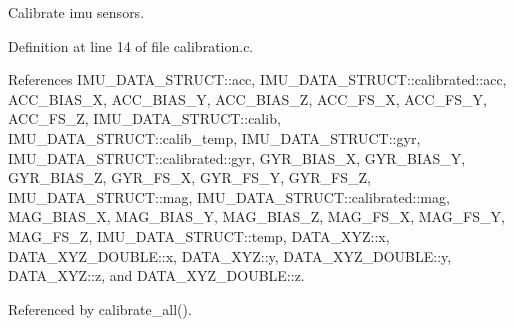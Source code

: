 Calibrate imu sensors. 



Definition at line 14 of file calibration.\-c.



References I\-M\-U\-\_\-\-D\-A\-T\-A\-\_\-\-S\-T\-R\-U\-C\-T\-::acc, I\-M\-U\-\_\-\-D\-A\-T\-A\-\_\-\-S\-T\-R\-U\-C\-T\-::calibrated\-::acc, A\-C\-C\-\_\-\-B\-I\-A\-S\-\_\-\-X, A\-C\-C\-\_\-\-B\-I\-A\-S\-\_\-\-Y, A\-C\-C\-\_\-\-B\-I\-A\-S\-\_\-\-Z, A\-C\-C\-\_\-\-F\-S\-\_\-\-X, A\-C\-C\-\_\-\-F\-S\-\_\-\-Y, A\-C\-C\-\_\-\-F\-S\-\_\-\-Z, I\-M\-U\-\_\-\-D\-A\-T\-A\-\_\-\-S\-T\-R\-U\-C\-T\-::calib, I\-M\-U\-\_\-\-D\-A\-T\-A\-\_\-\-S\-T\-R\-U\-C\-T\-::calib\-\_\-temp, I\-M\-U\-\_\-\-D\-A\-T\-A\-\_\-\-S\-T\-R\-U\-C\-T\-::gyr, I\-M\-U\-\_\-\-D\-A\-T\-A\-\_\-\-S\-T\-R\-U\-C\-T\-::calibrated\-::gyr, G\-Y\-R\-\_\-\-B\-I\-A\-S\-\_\-\-X, G\-Y\-R\-\_\-\-B\-I\-A\-S\-\_\-\-Y, G\-Y\-R\-\_\-\-B\-I\-A\-S\-\_\-\-Z, G\-Y\-R\-\_\-\-F\-S\-\_\-\-X, G\-Y\-R\-\_\-\-F\-S\-\_\-\-Y, G\-Y\-R\-\_\-\-F\-S\-\_\-\-Z, I\-M\-U\-\_\-\-D\-A\-T\-A\-\_\-\-S\-T\-R\-U\-C\-T\-::mag, I\-M\-U\-\_\-\-D\-A\-T\-A\-\_\-\-S\-T\-R\-U\-C\-T\-::calibrated\-::mag, M\-A\-G\-\_\-\-B\-I\-A\-S\-\_\-\-X, M\-A\-G\-\_\-\-B\-I\-A\-S\-\_\-\-Y, M\-A\-G\-\_\-\-B\-I\-A\-S\-\_\-\-Z, M\-A\-G\-\_\-\-F\-S\-\_\-\-X, M\-A\-G\-\_\-\-F\-S\-\_\-\-Y, M\-A\-G\-\_\-\-F\-S\-\_\-\-Z, I\-M\-U\-\_\-\-D\-A\-T\-A\-\_\-\-S\-T\-R\-U\-C\-T\-::temp, D\-A\-T\-A\-\_\-\-X\-Y\-Z\-::x, D\-A\-T\-A\-\_\-\-X\-Y\-Z\-\_\-\-D\-O\-U\-B\-L\-E\-::x, D\-A\-T\-A\-\_\-\-X\-Y\-Z\-::y, D\-A\-T\-A\-\_\-\-X\-Y\-Z\-\_\-\-D\-O\-U\-B\-L\-E\-::y, D\-A\-T\-A\-\_\-\-X\-Y\-Z\-::z, and D\-A\-T\-A\-\_\-\-X\-Y\-Z\-\_\-\-D\-O\-U\-B\-L\-E\-::z.



Referenced by calibrate\-\_\-all().


